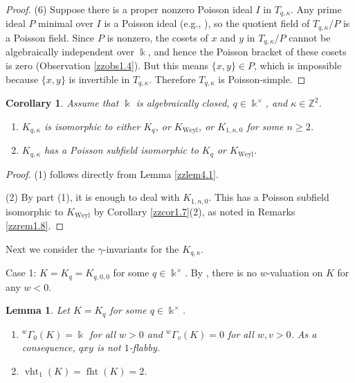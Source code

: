 \documentclass[12pt]{amsart}
\theoremstyle{plain}
\newtheorem{lemma}[theorem]{Lemma}
\newtheorem{corollary}[theorem]{Corollary}
\numberwithin{theorem}{section}
\numberwithin{equation}{theorem}
\theoremstyle{definition}
\newcommand{\ZZ}{\mathbb{Z}}
\DeclareMathOperator{\fht}{fht}
\DeclareMathOperator{\vht}{vht}
\DeclareMathOperator{\Weyl}{Weyl}
\newcommand \Kweyl {K_{\Weyl}}
\newcommand \kx {\Bbbk^\times}
\begin{document}
\begin{proof}
(6) Suppose there is a proper nonzero Poisson ideal $I$ in $T_{q,\kappa}$.  Any prime ideal $P$ minimal over $I$ is a Poisson ideal (e.g., \cite[Lemma 1.1(c)]{Go1}), so the quotient field of $T_{q,\kappa}/P$ is a Poisson field.  Since $P$ is nonzero, the cosets of $x$ and $y$ in  $T_{q,\kappa}/P$ cannot be algebraically independent over $\Bbbk$, and hence the Poisson bracket of these cosets is zero (Observation \ref{zzobs1.4}).  But this means $\{x,y\} \in P$, which is impossible because $\{x,y\}$ is invertible in $T_{q,\kappa}$.  Therefore $T_{q,\kappa}$ is Poisson-simple.
\end{proof}

\begin{corollary}  
\label{zzcor4.2}  
Assume that $\Bbbk$ is algebraically closed, $q \in \kx$, and $\kappa \in \ZZ^2$.  
\begin{enumerate}
\item[(1)]
 $K_{q,\kappa}$ 
is isomorphic to either $K_{q}$, or $\Kweyl$, or $K_{1,n,0}$
for some $n\geq 2$. 
\item[(2)]
$K_{q,\kappa}$ has a Poisson subfield isomorphic to $K_q$ or $\Kweyl$.
\end{enumerate}
\end{corollary}

\begin{proof}
(1) follows directly from Lemma \ref{zzlem4.1}.

(2) By part (1), it is enough to deal with $K_{1,n,0}$.  This has a Poisson subfield isomorphic to $\Kweyl$ by Corollary \ref{zzcor1.7}(2), as noted in Remarks \ref{zzrem1.8}.
\end{proof}

Next we consider the $\gamma$-invariants for 
the $K_{q,\kappa}$.
\medskip

Case 1: $K=K_q=K_{q,0,0}$ for some $q\in \Bbbk^{\times}$. By
\cite[Theorem 6.2(3)]{HTWZ1}, there is no $w$-valuation on $K$ for any 
$w<0$. 

\begin{lemma}
\label{zzlem4.3}
Let $K=K_q$ for some $q\in \Bbbk^{\times}$. 
\begin{enumerate}
\item[(1)]
${^w\Gamma}_{0}(K)=\Bbbk$ for all $w>0$ and 
${^w\Gamma}_{v}(K)=0$ for all $w,v>0$. As a consequence,
$qxy$ is not $1$-flabby.
\item[(2)]
$\vht_1(K)=\fht(K)=2$.
\end{enumerate}
\end{lemma}
\end{document}
